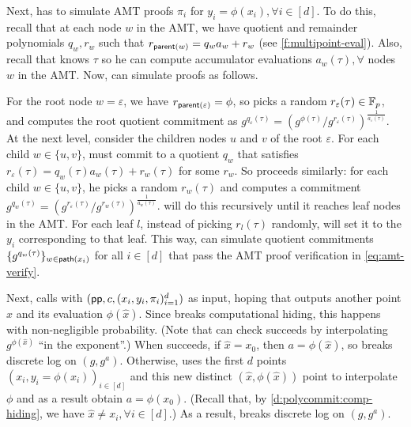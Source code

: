 Next, \AdvB has to simulate AMT proofs $\pi_i$ for $y_i = \phi(x_i), \forall i\in[d]$.
To do this, recall that at each node $w$ in the AMT, we have quotient and remainder polynomials $q_w,r_w$ such that $r_{\mathsf{parent}(w)} = q_w a_w + r_w$ (see \cref{f:multipoint-eval}).
Also, recall that \AdvB knows $\tau$ so he can compute accumulator evaluations $a_w(\tau), \forall$ nodes $w$ in the AMT.
Now, \AdvB can simulate proofs as follows.

For the root node $w = \varepsilon$, we have $r_{\mathsf{parent}(\varepsilon)} = \phi$, so \AdvB picks a random $r_\varepsilon(\tau)\in \mathbb{F}_p$, and computes the root quotient commitment as $g^{q_\varepsilon(\tau)}=(g^{\phi(\tau)}/g^{r_\varepsilon(\tau)})^{\frac{1}{a_\varepsilon(\tau)}}$.
At the next level, consider the children nodes $u$ and $v$ of the root $\varepsilon$.
For each child $w\in\{u,v\}$, \AdvB must commit to a quotient $q_w$ that satisfies $r_\varepsilon(\tau)=q_w(\tau) a_w(\tau) + r_w(\tau)$ for some $r_w$.
So \AdvB proceeds similarly: for each child $w\in\{u,v\}$, he picks a random $r_w(\tau)$ and computes a commitment $g^{q_w(\tau)}=(g^{r_\varepsilon(\tau)}/g^{r_w(\tau)})^{\frac{1}{a_w(\tau)}}$.
\AdvB will do this recursively until it reaches leaf nodes in the AMT.
For each leaf $l$, instead of picking $r_l(\tau)$ randomly, \AdvB will set it to the $y_i$ corresponding to that leaf.
This way, \AdvB can simulate quotient commitments $\{g^{q_w(\tau)}\}_{w\in \mathsf{path}(x_i)}$ for all $i\in[d]$ that pass the AMT proof verification in \cref{eq:amt-verify}.

Next, \AdvB calls \Adv with $(\mathsf{pp}, c, (x_i, y_i, \pi_i)_{i=1}^d)$ as input, hoping that \Adv outputs another point $\hat{x}$ and its evaluation $\phi(\hat{x})$.
Since \Adv breaks computational hiding, this happens with non-negligible probability.
(Note that \AdvB can check \Adv succeeds by interpolating $g^{\phi(\hat{x})}$ ``in the exponent''.)
When \Adv succeeds, if $\hat{x}=x_0$, then $a = \phi(\hat{x})$, so \AdvB breaks discrete log on $(g,g^a)$.
Otherwise, \AdvB uses the first $d$ points $(x_i, y_i=\phi(x_i))_{i\in [d]}$ and this new distinct $(\hat{x},\phi(\hat{x}))$ point to interpolate $\phi$ and as a result obtain $a = \phi(x_0)$.
(Recall that, by \cref{d:polycommit:comp-hiding}, we have $\hat{x}\ne x_i,\forall i\in[d]$.)
As a result, \AdvB breaks discrete log on $(g,g^a)$.

